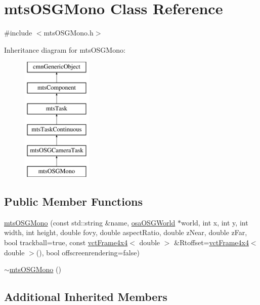 \hypertarget{classmts_o_s_g_mono}{\section{mts\-O\-S\-G\-Mono Class Reference}
\label{classmts_o_s_g_mono}
}


{\ttfamily \#include $<$mts\-O\-S\-G\-Mono.\-h$>$}

Inheritance diagram for mts\-O\-S\-G\-Mono\-:\begin{figure}[H]
\begin{center}
\leavevmode
\includegraphics[height=6.000000cm]{d6/de2/classmts_o_s_g_mono}
\end{center}
\end{figure}
\subsection*{Public Member Functions}
\begin{DoxyCompactItemize}
\item 
\hyperlink{classmts_o_s_g_mono_a45a1c6d8440c6106d7420b04e9a42604}{mts\-O\-S\-G\-Mono} (const std\-::string \&name, \hyperlink{classosa_o_s_g_world}{osa\-O\-S\-G\-World} $\ast$world, int x, int y, int width, int height, double fovy, double aspect\-Ratio, double z\-Near, double z\-Far, bool trackball=true, const \hyperlink{classvct_frame4x4}{vct\-Frame4x4}$<$ double $>$ \&Rtoffset=\hyperlink{classvct_frame4x4}{vct\-Frame4x4}$<$ double $>$(), bool offscreenrendering=false)
\item 
\hyperlink{classmts_o_s_g_mono_a9d0f87dbf36167ea4c258a7e1466202e}{$\sim$mts\-O\-S\-G\-Mono} ()
\end{DoxyCompactItemize}
\subsection*{Additional Inherited Members}


